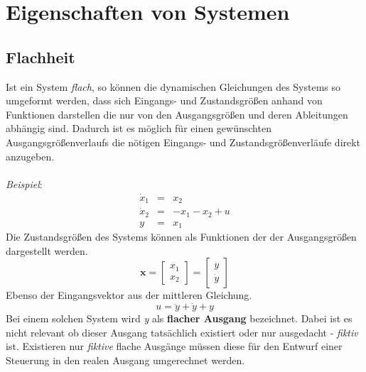 \section{Eigenschaften von Systemen}
	\subsection{Flachheit}
		Ist ein System \textit{flach}, so können die dynamischen Gleichungen des Systems so umgeformt werden, dass sich Eingangs- und Zustandsgrößen anhand von Funktionen darstellen die nur von den Ausgangsgrößen und deren Ableitungen abhängig sind. Dadurch ist es möglich für einen gewünschten Ausgangsgrößenverlaufs die nötigen Eingangs- und Zustandsgrößenverläufe direkt anzugeben. \\\\
		\textit{Beispiel}:
		\begin{eqnarray} 
			\dot{x}_{1}&=& x_{2}\nonumber\\
			\dot{x}_{2}&=& -x_{1}-x_{2}+u\nonumber\\
			y&=&x_{1}\nonumber
		\end{eqnarray}
		Die Zustandsgrößen des Systems können als Funktionen der der Ausgangsgrößen dargestellt werden.
		\[\bm{x}=\begin{bmatrix}x_{1}\\x_{2}\end{bmatrix} = \begin{bmatrix}y\\\dot{y}\end{bmatrix} \]
		Ebenso der Eingangsvektor aus der mittleren Gleichung.
		\[u=\ddot{y}+\dot{y}+y\]
		Bei einem solchen System wird \textit{y} als \textbf{flacher Ausgang} bezeichnet. Dabei ist es nicht relevant ob dieser Ausgang tatsächlich existiert oder nur ausgedacht - \textit{fiktiv} ist. Existieren nur \textit{fiktive} flache Ausgänge müssen diese für den Entwurf einer Steuerung in den realen Ausgang umgerechnet werden.\\
